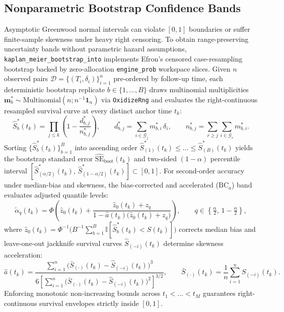 \documentclass{article}
\begin{document}
\subsection{Nonparametric Bootstrap Confidence Bands}
Asymptotic Greenwood normal intervals can violate $[0, 1]$ boundaries or suffer finite-sample skewness under heavy right censoring. To obtain range-preserving uncertainty bands without parametric hazard assumptions, \texttt{kaplan\_meier\_bootstrap\_into} implements Efron's censored case-resampling bootstrap \cite{efron1981censored} backed by zero-allocation \texttt{engine\_prob} workspace slices. Given $n$ observed pairs $\mathcal{D} = \{(T_i, \delta_i)\}_{i=1}^n$ pre-ordered by follow-up time, each deterministic bootstrap replicate $b \in \{1, \dots, B\}$ draws multinomial multiplicities $\mathbf{m}^*_b \sim \mathrm{Multinomial}(n; n^{-1}\mathbf{1}_n)$ via \texttt{OxidizeRng} and evaluates the right-continuous resampled survival curve at every distinct anchor time $t_k$:
\begin{equation}
\hat{S}^*_b(t_k) = \prod_{j \le k} \left(1 - \frac{d^*_{b,j}}{n^*_{b,j}}\right), \qquad d^*_{b,j} = \sum_{i \in \mathcal{G}_j} m^*_{b,i}\,\delta_i, \qquad n^*_{b,j} = \sum_{r \ge j} \sum_{i \in \mathcal{G}_r} m^*_{b,i}.
\end{equation}
Sorting $\{\hat{S}^*_b(t_k)\}_{b=1}^B$ into ascending order $\hat{S}^*_{(1)}(t_k) \le \dots \le \hat{S}^*_{(B)}(t_k)$ yields the bootstrap standard error $\widehat{\mathrm{SE}}_{\mathrm{boot}}(t_k)$ and two-sided $(1-\alpha)$ percentile interval $[\hat{S}^*_{(\alpha/2)}(t_k),\, \hat{S}^*_{(1-\alpha/2)}(t_k)] \subset [0, 1]$. For second-order accuracy under median-bias and skewness, the bias-corrected and accelerated ($\mathrm{BC}_a$) band \cite{efron1987better} evaluates adjusted quantile levels:
\begin{equation}
\tilde{\alpha}_q(t_k) = \Phi\!\left(\hat{z}_0(t_k) + \frac{\hat{z}_0(t_k) + z_q}{1 - \hat{a}(t_k)\bigl(\hat{z}_0(t_k) + z_q\bigr)}\right), \qquad q \in \left\{\tfrac{\alpha}{2},\, 1 - \tfrac{\alpha}{2}\right\},
\end{equation}
where $\hat{z}_0(t_k) = \Phi^{-1}\!\bigl(B^{-1}\sum_{b=1}^B \mathbb{I}[\hat{S}^*_b(t_k) < \hat{S}(t_k)]\bigr)$ corrects median bias and leave-one-out jackknife survival curves $\hat{S}_{(-i)}(t_k)$ determine skewness acceleration:
\begin{equation}
\hat{a}(t_k) = \frac{\sum_{i=1}^n \bigl(\bar{S}_{(\cdot)}(t_k) - \hat{S}_{(-i)}(t_k)\bigr)^3}{6 \left[\sum_{i=1}^n \bigl(\bar{S}_{(\cdot)}(t_k) - \hat{S}_{(-i)}(t_k)\bigr)^2\right]^{3/2}}, \qquad \bar{S}_{(\cdot)}(t_k) = \frac{1}{n}\sum_{i=1}^n \hat{S}_{(-i)}(t_k).
\end{equation}
Enforcing monotonic non-increasing bounds across $t_1 < \dots < t_M$ guarantees right-continuous survival envelopes strictly inside $[0, 1]$.
\end{document}

